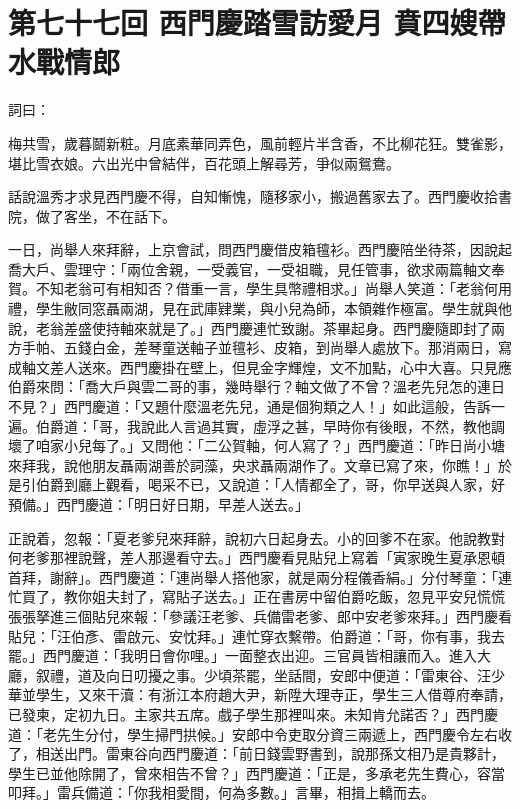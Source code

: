 
\chapter*{第七十七回 西門慶踏雪訪愛月 賁四嫂帶水戰情郎}


詞曰：

\begin{myquote} 
梅共雪，歲暮鬬新粧。月底素華同弄色，風前輕片半含香，不比柳花狂。雙雀影，堪比雪衣娘。六出光中曾結伴，百花頭上解尋芳，爭似兩鴛鴦。

\end{myquote} 

話說溫秀才求見西門慶不得，自知慚愧，隨移家小，搬過舊家去了。西門慶收拾書院，做了客坐，不在話下。

一日，尚舉人來拜辭，上京會試，問西門慶借皮箱氊衫。西門慶陪坐待茶，因說起喬大戶、雲理守：「兩位舍親，一受義官，一受祖職，見任管事，欲求兩篇軸文奉賀。不知老翁可有相知否？借重一言，學生具幣禮相求。」尚舉人笑道：「老翁何用禮，學生敝同窓聶兩湖，見在武庫肄業，與小兒為師，本領雜作極富。學生就與他說，老翁差盛使持軸來就是了。」西門慶連忙致謝。茶畢起身。西門慶隨即封了兩方手帕、五錢白金，差琴童送軸子並氊衫、皮箱，到尚舉人處放下。那消兩日，寫成軸文差人送來。西門慶掛在壁上，但見金字輝煌，文不加點，心中大喜。只見應伯爵來問：「喬大戶與雲二哥的事，幾時舉行？軸文做了不曾？溫老先兒怎的連日不見？」西門慶道：「又題什麼溫老先兒，通是個狗類之人！」如此這般，告訴一遍。伯爵道：「哥，我說此人言過其實，虛浮之甚，早時你有後眼，不然，教他調壞了咱家小兒每了。」又問他：「二公賀軸，何人寫了？」西門慶道：「昨日尚小塘來拜我，說他朋友聶兩湖善於詞藻，央求聶兩湖作了。文章已寫了來，你瞧！」於是引伯爵到廳上觀看，喝采不已，又說道：「人情都全了，哥，你早送與人家，好預備。」西門慶道：「明日好日期，早差人送去。」

正說着，忽報：「夏老爹兒來拜辭，說初六日起身去。小的回爹不在家。他說教對何老爹那裡說聲，差人那邊看守去。」西門慶看見貼兒上寫着「寅家晚生夏承恩頓首拜，謝辭」。西門慶道：「連尚舉人搭他家，就是兩分程儀香絹。」分付琴童：「連忙買了，教你姐夫封了，寫貼子送去。」正在書房中留伯爵吃飯，忽見平安兒慌慌張張拏進三個貼兒來報：「參議汪老爹、兵備雷老爹、郎中安老爹來拜。」西門慶看貼兒：「汪伯彥、雷啟元、安忱拜。」連忙穿衣繫帶。伯爵道：「哥，你有事，我去罷。」西門慶道：「我明日會你哩。」一面整衣出迎。三官員皆相讓而入。進入大廳，叙禮，道及向日叨擾之事。少頃茶罷，坐話間，安郎中便道：「雷東谷、汪少華並學生，又來干瀆：有浙江本府趙大尹，新陞大理寺正，學生三人借尊府奉請，已發柬，定初九日。主家共五席。戲子學生那裡叫來。未知肯允諾否？」西門慶道：「老先生分付，學生掃門拱候。」{}安郎中令吏取分資三兩遞上，西門慶令左右收了，相送出門。雷東谷向西門慶道：「前日錢雲野書到，說那孫文相乃是貴夥計，學生已並他除開了，曾來相告不曾？」西門慶道：「正是，多承老先生費心，容當叩拜。」雷兵備道：「你我相愛間，何為多數。」言畢，相揖上轎而去。

